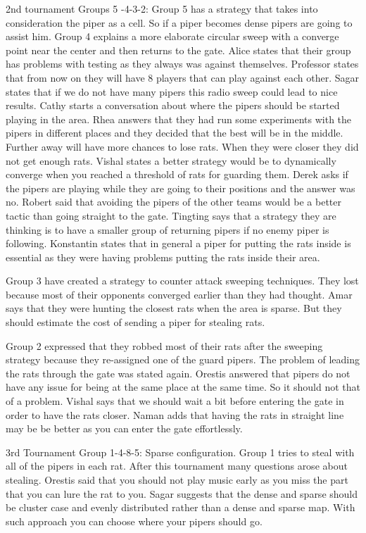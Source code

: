 2nd tournament Groups 5 -4-3-2:
Group 5 has a strategy that takes into consideration the piper as a cell. So if a piper becomes dense pipers are going to assist him.
Group 4 explains a more elaborate circular sweep with a converge point near the center and then returns to the gate.
Alice states that their group has problems with testing as they always was against themselves.
Professor states that from now on they will have 8 players that can play against each other.
Sagar states that if we do not have many pipers this radio sweep could lead to nice results.
Cathy starts a conversation about where the pipers should be started playing in the area.
Rhea answers that they had run some experiments with the pipers in different places and they decided that the best will be in the middle. Further away will have more chances to lose rats. When they were closer they did not get enough rats. 
Vishal states a better strategy would be to dynamically converge when you reached a threshold of rats for guarding them.
Derek asks if the pipers are playing while they are going to their positions and the answer was no.
Robert said that avoiding the pipers of the other teams would be a better tactic than going straight to the gate.
Tingting says that a strategy they are thinking is to have a smaller group of returning pipers if no enemy piper is following.
Konstantin states that in general a piper for putting the rats inside is essential as they were having problems putting the rats inside their area.

Group 3 have created a strategy to counter attack sweeping techniques. They lost 
because most of their opponents converged earlier than they had thought.
Amar says that they were hunting the closest rats when the area is sparse. But 
they should estimate the cost of sending a piper for stealing rats.

Group 2 expressed that they robbed most of their rats after the sweeping strategy 
because they re-assigned one of the guard pipers. 
The problem of leading the rats through the gate was stated again. Orestis answered 
that pipers do not have any issue for being at the same place at the same time. 
So it should not that of a problem.
Vishal says that we should wait a bit before entering the gate in order to have 
the rats closer.
Naman adds that having the rats in straight line may be be better as you can enter 
the gate effortlessly.

3rd Tournament Group 1-4-8-5:
Sparse configuration.
Group 1 tries to steal with all of the pipers in each rat.
After this tournament many questions arose about stealing. Orestis said that you 
should not play music early as you miss the part that you can lure the rat to you.
Sagar suggests that the dense and sparse should be cluster case and evenly distributed rather than a dense and sparse map. With such approach you can choose where your pipers should go. 


